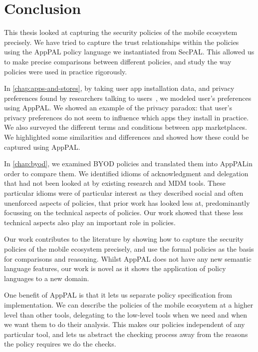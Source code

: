 \documentclass[thesis.tex]{subfiles}
\begin{document}
\chapter{Conclusion}

This thesis looked at capturing the security policies of the
mobile ecosystem precisely. We have tried to capture the trust
relationships within the policies using the AppPAL policy language we
instantiated from SecPAL. This allowed us to make precise comparisons
between different policies, and study the way policies were used in
practice rigorously.

In \autoref{chap:apps-and-stores}, by taking user app installation
data, and privacy preferences found by researchers talking to
users~\cite{lin_modeling_2014}, we modeled user's preferences using
AppPAL. We showed an example of the privacy paradox: that user's
privacy preferences do not seem to influence which apps they install
in practice.  We also surveyed the different terms and
conditions between app marketplaces.  We highlighted some similarities and differences and showed how these could be captured
using AppPAL.

In \autoref{chap:byod}, we examined BYOD policies and translated them
into AppPALin order to compare them. We identified idioms of
acknowledgment and delegation that had not been looked at by existing
research and \ac{MDM} tools. These particular idioms were of
particular interest as they described social and often unenforced
aspects of policies, that prior work has looked less at, predominantly
focussing on the technical aspects of policies.  Our work showed that these less technical aspects also play an important role in policies.

Our work contributes to the literature by showing how to capture the
security policies of the mobile ecosystem precisely, and use the
formal policies as the basis for comparisons and reasoning. Whilst
AppPAL does not have any new semantic language features, our work is
novel as it shows the application of policy languages to a new domain.

One benefit of AppPAL is that it lets us separate policy specification
from implementation. We can describe the policies of the mobile
ecosystem at a higher level than other tools, delegating to the
low-level tools when we need and when we want them to do their
analysis. This makes our policies independent of any particular tool,
and lets us abstract the checking process away from the reasons the
policy requires we do the checks.
\end{document}
